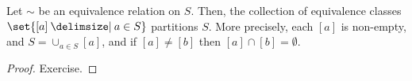 \documentclass[11pt]{penrose}
\begin{document}
\begin{nthm}
    Let $\sim$ be an equivalence relation on $S$. Then, the collection of equivalence classes $\set{[a] \st a \in S}$ partitions $S$. More precisely, each $[a]$ is non-empty, and $S = \cup_{a \in S} [a]$, and if $[a] \neq [b]$ then $[a] \cap [b] = \emptyset$.
\end{nthm}
\begin{proof}
    Exercise.
\end{proof}
\end{document}
